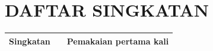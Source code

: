 \cleardoublepage
{}
{}
\chapter*{DAFTAR SINGKATAN}
\label{chap:singkatan}
\setcounter{chapter}{0}
\setcounter{section}{0}


\begin{longtable}{@{} l >{\raggedright\arraybackslash}p{8cm} c @{}}
\multicolumn{1}{l}{\textbf{Singkatan}} & \multicolumn{1}{l}{\textbf{Deskripsi}} & \multicolumn{1}{l}{\parbox[c]{2.5cm}{\raggedright \textbf{Pemakaian pertama kali}}} \\
\hline


\end{longtable}
